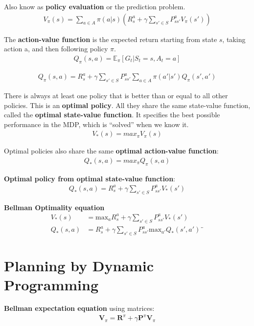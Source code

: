 \documentclass[journal]{IEEEtran}
\begin{document}
Also know as \textbf{policy evaluation} or the prediction problem.
\begin{align*}
V_\pi (s) = \sum_{a\in A} \pi(a|s) \left( R_s^a + \gamma\sum_{s'\in S}P_{ss'}^a V_\pi(s') \right)
\end{align*}

The \textbf{action-value function} is the expected return starting from state $s$, taking action a, and then following policy $\pi$.
\begin{align*}
Q_\pi(s,a) = \mathbb{E}_\pi [G_t |S_t=s,A_t=a]
\end{align*}

\begin{align*}
Q_\pi(s,a) = R_s^a + \gamma\sum_{s'\in S}P_{ss'}^a\sum_{a\in A}\pi(a'|s')Q_\pi(s',a')
\end{align*}

There is always at least one policy that is better than or equal to all other
policies. This is an \textbf{optimal policy}. All they share the same state-value function, called the \textbf{optimal state-value function}. It specifies the best possible performance in the MDP, which is “solved” when we know it.
\begin{align*}
V_*(s) = max_\pi V_\pi(s)
\end{align*}

Optimal policies also share the same \textbf{optimal action-value function}:
\begin{align*}
Q_*(s,a) = max_\pi Q_\pi(s,a)
\end{align*}

\textbf{Optimal policy from optimal state-value function}: 
\begin{align*}
Q_*(s,a) = R_s^a + \gamma\sum_{s'\in S} P_{ss'}^a V_*(s')
\end{align*}

\textbf{Bellman Optimality equation} 
\begin{align*}
V_*(s) &= \mbox{max}_a R_s^a + \gamma\sum_{s'\in S}P_{ss'}^a V_*(s') \\
Q_*(s,a) &= R_s^a + \gamma\sum_{s'\in S}P_{ss'}^a \mbox{max}_{a'}Q_*(s',a')¨
\end{align*}

\section{Planning by Dynamic Programming}

\textbf{Bellman expectation equation} using matrices:
\begin{align*}
\mathbf{V}_\pi = \mathbf{R}^\pi + \gamma \mathbf{P}^\pi\mathbf{V}_\pi
\end{align*}
\end{document}
